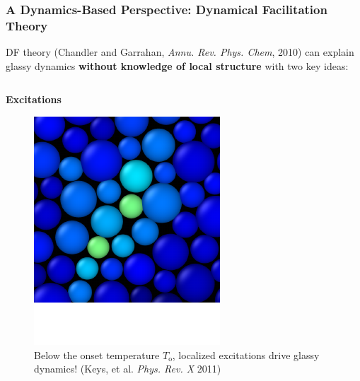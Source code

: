 \begin{frame}[t]\label{a.2}
\frametitle{A Dynamics-Based Perspective: Dynamical Facilitation Theory}

DF theory (Chandler and Garrahan, \textit{Annu. Rev. Phys. Chem}, 2010) can explain glassy dynamics \textbf{without knowledge of local structure} with two key ideas:



\begin{columns}[T]
\begin{column}[T]{0.5\textwidth}

\centering\textbf{\Large Excitations}

\begin{figure}[t]
\begin{overprint}

\centering\includegraphics[height=0.525\textheight]{a.2-intro_dftheory/DF_Theory_Excitations_Zoom_0.pdf}\caption{Below the onset temperature $T_\mathrm{o}$, localized excitations drive glassy dynamics! (Keys, et al. \textit{Phys. Rev. X} 2011)}


\end{overprint}
\end{figure}
\end{column}
\end{columns}
\end{frame}
